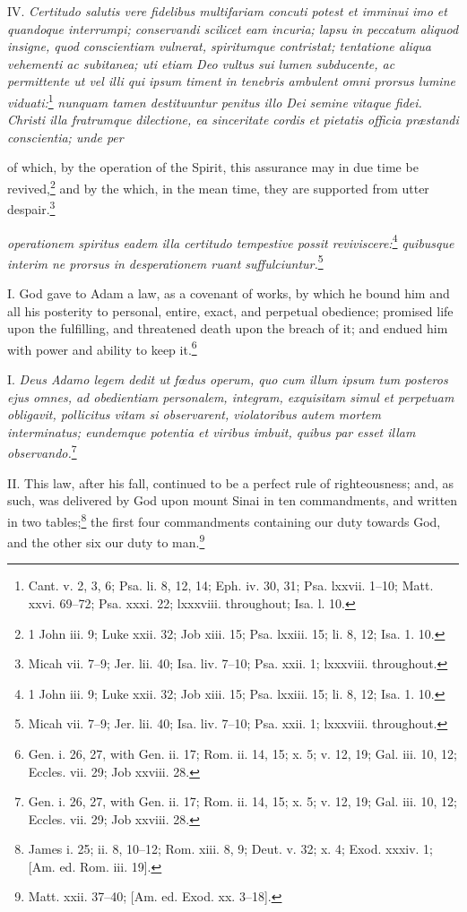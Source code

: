 IV. \emph{Certitudo salutis vere fidelibus multifariam concuti potest et imminui imo et quandoque interrumpi; conservandi scilicet eam incuria; lapsu in peccatum aliquod insigne, quod conscientiam vulnerat, spiritumque contristat; tentatione aliqua vehementi ac subitanea; uti etiam Deo vultus sui lumen subducente, ac permittente ut vel illi qui ipsum timent in tenebris ambulent omni prorsus lumine viduati:}\footnote{Cant. v. 2, 3, 6; Psa. li. 8, 12, 14; Eph. iv. 30, 31; Psa. lxxvii. 1–10; Matt. xxvi. 69–72; Psa. xxxi. 22; lxxxviii. throughout; Isa. l. 10.}\emph{ nunquam tamen destituuntur penitus illo Dei semine vitaque fidei. Christi illa fratrumque dilectione, ea sinceritate cordis et pietatis officia præstandi conscientia; unde per }

of which, by the operation of the Spirit, this assurance may in due time be revived,\footnote{1 John iii. 9; Luke xxii. 32; Job xiii. 15; Psa. lxxiii. 15; li. 8, 12; Isa. 1. 10.} and by the which, in the mean time, they are supported from utter despair.\footnote{Micah vii. 7–9; Jer. lii. 40; Isa. liv. 7–10; Psa. xxii. 1; lxxxviii. throughout.}

\emph{operationem spiritus eadem illa certitudo tempestive possit reviviscere:}\footnote{1 John iii. 9; Luke xxii. 32; Job xiii. 15; Psa. lxxiii. 15; li. 8, 12; Isa. 1. 10.}\emph{ quibusque interim ne prorsus in desperationem ruant suffulciuntur.}\footnote{Micah vii. 7–9; Jer. lii. 40; Isa. liv. 7–10; Psa. xxii. 1; lxxxviii. throughout.}


I. God gave to Adam a law, as a covenant of works, by which he bound him and all his posterity to personal, entire, exact, and perpetual obedience; promised life upon the fulfilling, and threatened death upon the breach of it; and endued him with power and ability to keep it.\footnote{Gen. i. 26, 27, with Gen. ii. 17; Rom. ii. 14, 15; x. 5; v. 12, 19; Gal. iii. 10, 12; Eccles. vii. 29; Job xxviii. 28.}

I. \emph{Deus Adamo legem dedit ut fœdus operum, quo cum illum ipsum tum posteros ejus omnes, ad obedientiam personalem, integram, exquisitam simul et perpetuam obligavit, pollicitus vitam si observarent, violatoribus autem mortem interminatus; eundemque potentia et viribus imbuit, quibus par esset illam observando.}\footnote{Gen. i. 26, 27, with Gen. ii. 17; Rom. ii. 14, 15; x. 5; v. 12, 19; Gal. iii. 10, 12; Eccles. vii. 29; Job xxviii. 28.}

II. This law, after his fall, continued to be a perfect rule of righteousness; and, as such, was delivered by God upon mount Sinai in ten commandments, and written in two tables;\footnote{James i. 25; ii. 8, 10–12; Rom. xiii. 8, 9; Deut. v. 32; x. 4; Exod. xxxiv. 1; [Am. ed. Rom. iii. 19].} the first four commandments containing our duty towards God, and the other six our duty to man.\footnote{Matt. xxii. 37–40; [Am. ed. Exod. xx. 3–18].}

